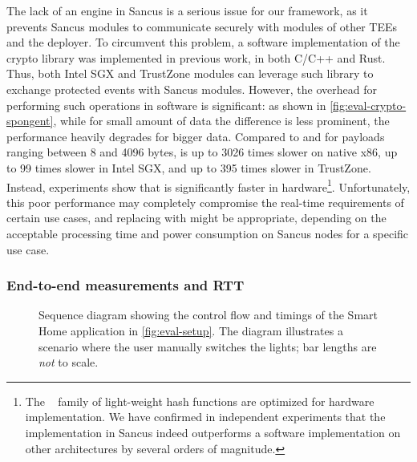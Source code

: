 The lack of an \aes{} engine in Sancus is a serious issue for our framework, as
it prevents Sancus modules to communicate securely with modules of other
\acp{TEE} and the deployer. To circumvent this problem, a software
implementation of the \spongent{} crypto library was implemented in previous
work, in both C/C++ and Rust. Thus, both Intel \ac{SGX} and TrustZone modules
can leverage such library to exchange protected events with Sancus modules.
However, the overhead for performing such operations in software is significant:
as shown in \cref{fig:eval-crypto-spongent}, while for small amount of data the
difference is less prominent, the performance heavily degrades for bigger data.
Compared to \aes{} and for payloads ranging between 8 and 4096 bytes,
\spongent{} is up to 3026 times slower on native x86, up to 99 times slower in
Intel \ac{SGX}, and up to 395 times slower in TrustZone. Instead, experiments
show that \spongent{} is significantly faster in hardware\footnote{The
\spongent{}~\cite{spongent} family of light-weight hash functions are optimized
for hardware implementation. We have confirmed in independent experiments that
the implementation in Sancus indeed outperforms a software implementation on
other architectures by several orders of magnitude.}. Unfortunately, this poor
performance may completely compromise the real-time requirements of certain use
cases, and replacing \spongent{} with \aes{} might be appropriate, depending on
the acceptable processing time and power consumption on Sancus nodes for a
specific use case.

\subsubsection{End-to-end measurements and RTT}
\label{eval:microb-rtt}

\newcommand{\seqboxtext}{}
\begin{figure}
  \resizebox{.9 \linewidth}{!}{} \caption{Sequence
  diagram showing the control flow and timings of the Smart Home application in
  \cref{fig:eval-setup}. The diagram illustrates a scenario where the user
  manually switches the lights; bar lengths are \emph{not} to scale. }
  \label{flt:sequence}
  \vspace{-3mm}
\end{figure}



